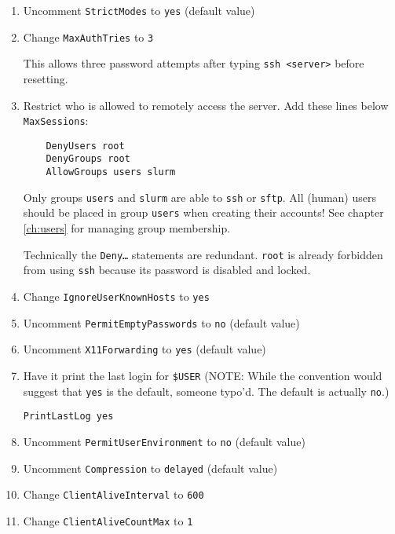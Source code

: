 \begin{enumerate}
\begin{enumerate}
	\item Uncomment \texttt{StrictModes} to \texttt{yes} (default value)

	\item Change \texttt{MaxAuthTries} to \texttt{3}

	This allows three password attempts after typing \texttt{ssh <server>} before resetting.

	\item Restrict who is allowed to remotely access the server. Add these lines below \texttt{MaxSessions}:
	\begin{verbatim}
	DenyUsers root
	DenyGroups root
	AllowGroups users slurm 
	\end{verbatim}

	Only groups \texttt{users} and \texttt{slurm} are able to \texttt{ssh} or \texttt{sftp}. All (human) users should be placed in group \texttt{users} when creating their accounts! See chapter \ref{ch:users} for managing group membership.

	Technically the \texttt{Deny\dots} statements are redundant. \texttt{root} is already forbidden from using \texttt{ssh} because its password is disabled and locked.

	\item Change \texttt{IgnoreUserKnownHosts} to \texttt{yes}

	\item Uncomment \texttt{PermitEmptyPasswords} to \texttt{no} (default value)

	\item Uncomment \texttt{X11Forwarding} to \texttt{yes} (default value)

	\item Have it print the last login for \texttt{\$USER} (NOTE: While the convention would suggest that \texttt{yes} is the default, someone typo'd. The default is actually \texttt{no}.)

		\texttt{PrintLastLog yes}

	\item Uncomment \texttt{PermitUserEnvironment} to \texttt{no} (default value)

	\item Uncomment \texttt{Compression} to \texttt{delayed} (default value)

	\item Change \texttt{ClientAliveInterval} to \texttt{600}

	\item Change \texttt{ClientAliveCountMax} to \texttt{1}


\end{enumerate}
\end{enumerate}
